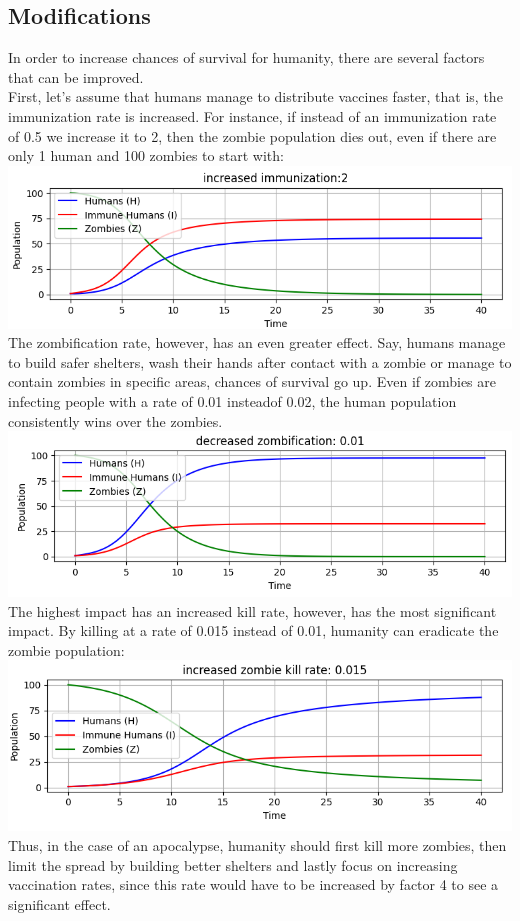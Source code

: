 \documentclass[
	12pt
]{article}
\begin{document}
\subsection{Modifications}
In order to increase chances of survival for humanity, there are several factors that can be improved. \\
First, let's assume that humans manage to distribute vaccines faster, that is, the immunization rate is increased. For instance, if instead of an immunization rate of 0.5 we increase it to 2, then the zombie population dies out, even if there are only 1 human and 100 zombies to start with:
\\
\includegraphics[width= \textwidth]{increased immunization.png}
\\
The zombification rate, however, has an even greater effect. Say, humans manage to build safer shelters, wash their hands after contact with a zombie or manage to contain zombies in specific areas, chances of survival go up. Even if zombies are infecting people with a rate of 0.01 insteadof 0.02, the human population consistently wins over the zombies.\\
\includegraphics[width= \textwidth]{zombification.png}\\
The highest impact has an increased kill rate, however, has the most significant impact. By killing at a rate of 0.015 instead of 0.01, humanity can eradicate the zombie population:\\
\includegraphics[width= \textwidth]{zombie kill rate.png}\\
Thus, in the case of an apocalypse, humanity should first kill more zombies, then limit the spread by building better shelters and lastly focus on increasing vaccination rates, since this rate would have to be increased by factor 4 to see a significant effect.
\end{document}
